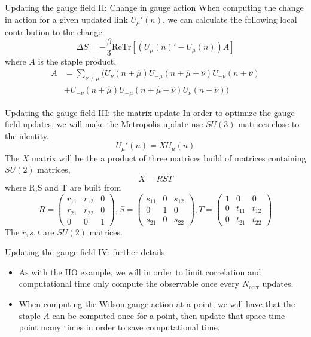 \documentclass[10pt]{beamer}
\newcommand{\Tr}{\mathrm{Tr}}
\begin{document}
\begin{frame}{Updating the gauge field II: Change in gauge action}
When computing the change in action for a given updated link $U_\mu'(n)$, we can calculate the following local contribution to the change
\[
\Delta S = - \frac{\beta}{3}\mathrm{Re}\Tr[(U_\mu(n)' - U_\mu(n))A]
\]
where $A$ is the staple product,
\[
\begin{split}
A &= \sum_{\nu\neq\mu}\big( U_\nu(n+\hat{\mu})U_{-\mu}(n+\hat{\mu}+\hat{\nu})U_{-\nu}(n+\hat{\nu}) \\
&+ U_{-\nu}(n+\hat{\mu})U_{-\mu}(n+\hat{\mu}-\hat{\nu})U_{\nu}(n-\hat{\nu})\big)
\end{split}
\]
\end{frame}


\begin{frame}{Updating the gauge field III: the matrix update}
In order to optimize the gauge field updates, we will make the Metropolis update use $SU(3)$ matrices close to the identity.
\[
U_\mu'(n) = X U_\mu(n)
\]
The $X$ matrix will be the a product of three matrices build of matrices containing $SU(2)$ matrices,
\[
X = RST
\]
where R,S and T are built from
\[
R = \begin{pmatrix}
r_{11} & r_{12} & 0 \\
r_{21} & r_{22} & 0 \\
0 & 0 & 1
\end{pmatrix}, 
S = \begin{pmatrix}
s_{11} & 0 & s_{12} \\
0 & 1 & 0 \\
s_{21} & 0 & s_{22}
\end{pmatrix},
T = \begin{pmatrix}
1 & 0 & 0 \\
0 & t_{11} & t_{12} \\
0 & t_{21} & t_{22}
\end{pmatrix}
\]
The $r,s,t$ are $SU(2)$ matrices.
\end{frame}


\begin{frame}{Updating the gauge field IV: further details}
\begin{itemize}
\item As with the HO example, we will in order to limit correlation and computational time only compute the observable once every $N_\text{corr}$ updates.
\item When computing the Wilson gauge action at a point, we will have that the staple $A$ can be computed once for a point, then update that space time point many times in order to save computational time.
\end{itemize}
\end{frame}
\end{document}
